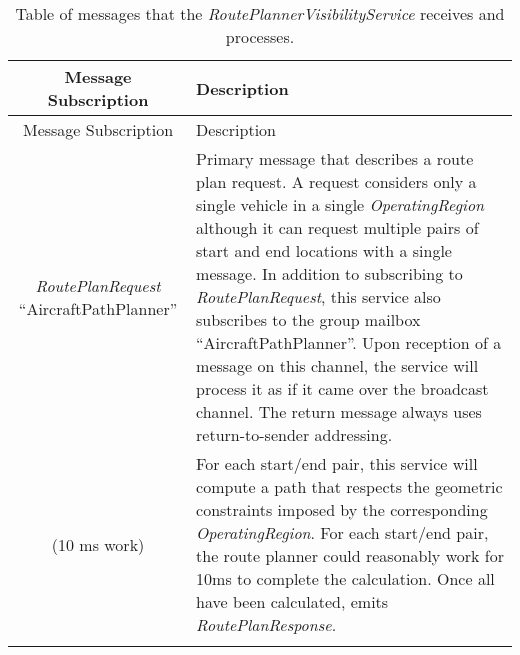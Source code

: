\begin{longtable}[]{@{}cl@{}}
\caption{Table of messages that the \emph{RoutePlannerVisibilityService}
receives and processes.}\tabularnewline
\toprule
\begin{minipage}[b]{0.40\columnwidth}\centering\strut
Message Subscription\strut
\end{minipage} & \begin{minipage}[b]{0.55\columnwidth}\raggedright\strut
Description\strut
\end{minipage}\tabularnewline
\midrule
\endfirsthead
\toprule
\begin{minipage}[b]{0.40\columnwidth}\centering\strut
Message Subscription\strut
\end{minipage} & \begin{minipage}[b]{0.55\columnwidth}\raggedright\strut
Description\strut
\end{minipage}\tabularnewline
\midrule
\endhead
\begin{minipage}[t]{0.40\columnwidth}\centering\strut
\emph{RoutePlanRequest} ``AircraftPathPlanner''\strut
\end{minipage} & \begin{minipage}[t]{0.55\columnwidth}\raggedright\strut
Primary message that describes a route plan request. A request considers
only a single vehicle in a single \emph{OperatingRegion} although it can
request multiple pairs of start and end locations with a single message.
In addition to subscribing to \emph{RoutePlanRequest}, this service also
subscribes to the group mailbox ``AircraftPathPlanner''. Upon reception
of a message on this channel, the service will process it as if it came
over the broadcast channel. The return message always uses
return-to-sender addressing.\strut
\end{minipage}\tabularnewline
\begin{minipage}[t]{0.40\columnwidth}\centering\strut
(10 ms work)\strut
\end{minipage} & \begin{minipage}[t]{0.55\columnwidth}\raggedright\strut
For each start/end pair, this service will compute a path that respects
the geometric constraints imposed by the corresponding
\emph{OperatingRegion}. For each start/end pair, the route planner could
reasonably work for 10ms to complete the calculation. Once all have been
calculated, emits \emph{RoutePlanResponse}.\strut
\end{minipage}\tabularnewline
\begin{minipage}[t]{0.40\columnwidth}\centering\strut

\end{minipage}
\end{longtable}
